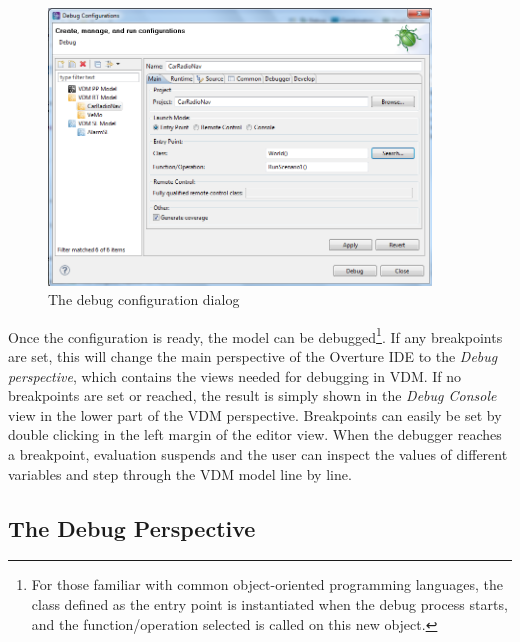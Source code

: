 \begin{figure}[htp]
\begin{center}
  \includegraphics[width=4in]{figures/debugConfigurationRT}
  \caption{The debug configuration dialog}
  \label{fig:userguide:debugConfiguration}
\end{center}
\end{figure}

Once the configuration is ready, the model can be debugged\footnote{For those familiar with common object-oriented programming languages, the class defined as the entry point is instantiated when the debug process starts, and the function/operation selected is called on this new object.}. If any breakpoints are set, this will change the main perspective of the 
Overture IDE to the \emph{Debug perspective}, which
contains the views needed for debugging in VDM. If no breakpoints are set or reached, the result is simply shown in the \emph{Debug Console} view in the lower part of the VDM perspective.  Breakpoints can easily
be set by double clicking in the left margin of the editor view. When
the debugger reaches a breakpoint, evaluation suspends and the user
can inspect the values of different variables and step through the VDM
model line by line.
 
\subsection{The Debug Perspective}

